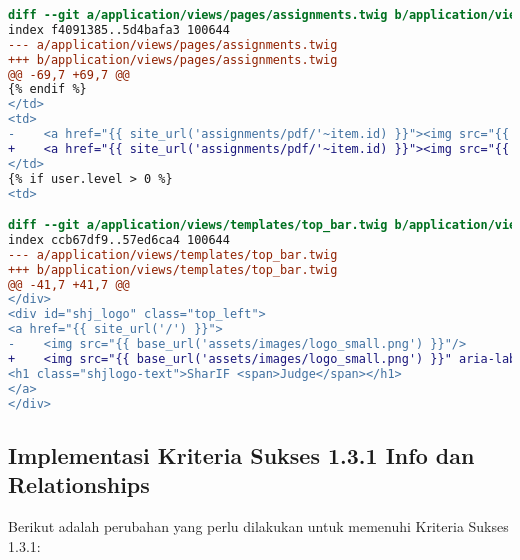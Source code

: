 \begin{itemize}
\begin{lstlisting}[language=diff, caption=Perubahan untuk mematuhi kriteria 1.1.1, label=lst_1.1.1, basicstyle=\ttfamily, frame=single,
columns=fullflexible, keepspaces=true, breaklines=true]
diff --git a/application/views/pages/assignments.twig b/application/views/pages/assignments.twig
index f4091385..5d4bafa3 100644
--- a/application/views/pages/assignments.twig
+++ b/application/views/pages/assignments.twig
@@ -69,7 +69,7 @@
{% endif %}
</td>
<td>
-    <a href="{{ site_url('assignments/pdf/'~item.id) }}"><img src="{{ base_url('assets/images/pdf.svg') }}" /></a>
+    <a href="{{ site_url('assignments/pdf/'~item.id) }}"><img src="{{ base_url('assets/images/pdf.svg') }}" aria-label="Download PDF For Assignment {{ item.name }}"/></a>
</td>
{% if user.level > 0 %}
<td>

diff --git a/application/views/templates/top_bar.twig b/application/views/templates/top_bar.twig
index ccb67df9..57ed6ca4 100644
--- a/application/views/templates/top_bar.twig
+++ b/application/views/templates/top_bar.twig
@@ -41,7 +41,7 @@
</div>
<div id="shj_logo" class="top_left">
<a href="{{ site_url('/') }}">
-    <img src="{{ base_url('assets/images/logo_small.png') }}"/>
+    <img src="{{ base_url('assets/images/logo_small.png') }}" aria-label="Logo SharIF Judge"/>
<h1 class="shjlogo-text">SharIF <span>Judge</span></h1>
</a>
</div>
\end{lstlisting}

\end{itemize}

\subsection{Implementasi Kriteria Sukses 1.3.1 Info dan Relationships}
\label{subsec:implementasi_A_1.3.1}

Berikut adalah perubahan yang perlu dilakukan untuk memenuhi Kriteria Sukses 1.3.1:

